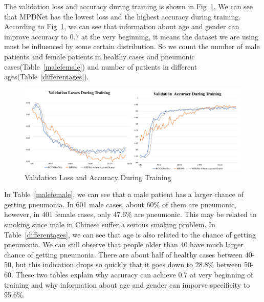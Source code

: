 \documentclass[journal]{IEEEtran}
\begin{document}
The validation loss and accuracy during training is shown in Fig~\ref{loss}. We can see that MPDNet has the lowest loss and the highest accuracy during training.
According to Fig~\ref{loss}, we can see that information about age and gender can improve accuracy to 0.7 at the very beginning, it means the dataset we are using must be influenced by some certain distribution. So we count the number of male patients and female patients in healthy cases and pneumonic cases(Table~\ref{malefemale}) and number of patients in different ages(Table~\ref{differentages}). 


\begin{figure}[t]
    \centerline{\includegraphics[width=180mm]{losses.pdf}}
    \vspace{-0cm}
    \caption{Validation Loss and Accuracy During Training}
    \vspace{-0cm}
    \label{loss}
    \end{figure}


In Table~\ref{malefemale}, we can see that a male patient has a larger chance of getting pneumonia. In 601 male cases, about 60\% of them are pneumonic, however, in 401 female cases, only 47.6\% are pneumonic. This may be related to smoking since male in Chinese suffer a serious smoking problem. 
In Table~\ref{differentages}, we can see that age is also related to the chance of getting pneumonia. We can still observe that people older than 40 have much larger chance of getting pneumonia. There are about half of healthy cases between 40-50, but this indication drops so quickly that it goes down to 28.8\% between 50-60. These two tables explain why accuracy can achieve 0.7 at very beginning of training and why information about age and gender can imporve specificity to 95.6\%.
\end{document}
